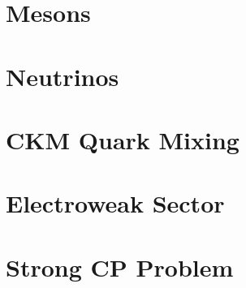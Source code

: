\documentclass[11pt,a4paper,twoside]{book}
\theoremstyle{definition}
\begin{document}
\part{Mesons}




\part{Neutrinos}




\part{CKM Quark Mixing}




\part{Electroweak Sector}







\part{Strong CP Problem}




\end{document}
